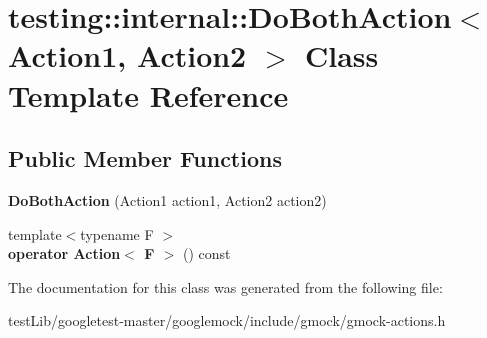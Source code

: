 \hypertarget{classtesting_1_1internal_1_1DoBothAction}{}\section{testing\+:\+:internal\+:\+:Do\+Both\+Action$<$ Action1, Action2 $>$ Class Template Reference}
\label{classtesting_1_1internal_1_1DoBothAction}
\subsection*{Public Member Functions}
\begin{DoxyCompactItemize}
\item 
\mbox{\label{classtesting_1_1internal_1_1DoBothAction_a55727c4dbdc1816ba6f1fe124e96088b}} 
{\bfseries Do\+Both\+Action} (Action1 action1, Action2 action2)
\item 
\mbox{\label{classtesting_1_1internal_1_1DoBothAction_a35733e2f117daad110bfbd3de84634a6}} 
{\footnotesize template$<$typename F $>$ }\\{\bfseries operator Action$<$ F $>$} () const
\end{DoxyCompactItemize}


The documentation for this class was generated from the following file\+:\begin{DoxyCompactItemize}
\item 
test\+Lib/googletest-\/master/googlemock/include/gmock/gmock-\/actions.\+h\end{DoxyCompactItemize}

